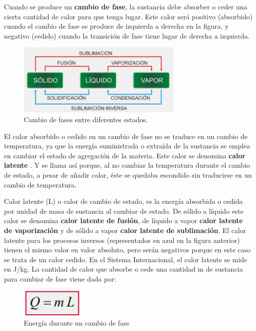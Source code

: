 \documentclass[journal,transmag]{IEEEtran}
\begin{document}
Cuando se produce un \textbf{cambio de fase}, la sustancia debe absorber o ceder una cierta cantidad de calor para que tenga lugar. Este calor será positivo (absorbido) cuando el cambio de fase se produce de izquierda a derecha en la figura, y negativo (cedido) cuando la transición de fase tiene lugar de derecha a izquierda. 
\begin{figure}[!h]
			\center
			\includegraphics[width=8cm]{img/fig2.png}
			\caption{Cambio de fases entre diferentes estados. }
			\label{f1}
		\end{figure}
		
El calor absorbido o cedido en un cambio de fase no se traduce en un cambio de temperatura, ya que la energía suministrada o extraída de la sustancia se emplea en cambiar el estado de agregación de la materia. Este calor se denomina \textbf{calor latente} . Y se llama así porque, al no cambiar la temperatura durante el cambio de estado, a pesar de añadir calor, éste se quedaba escondido sin traducirse en un cambio de temperatura.

Calor latente (L) o calor de cambio de estado, es la energía absorbida o cedida por unidad de masa de sustancia al cambiar de estado. De sólido a líquido este calor se denomina \textbf{calor latente de fusión}, de líquido a vapor \textbf{calor latente de vaporización} y de sólido a vapor \textbf{calor latente de sublimación}.
El calor latente para los procesos inversos (representados en azul en la figura anterior) tienen el mismo valor en valor absoluto, pero serán negativos porque en este caso se trata de un calor cedido.
En el Sistema Internacional, el calor latente se mide en J/kg.
La cantidad de calor que absorbe o cede una cantidad m de sustancia para cambiar de fase viene dada por:
\begin{figure}[!h]
			\center
			\includegraphics[width=3cm]{img/eq2.png}
			\caption{Energía durante un cambio de fase }
			\label{f1}
		\end{figure}
		
\end{document}
